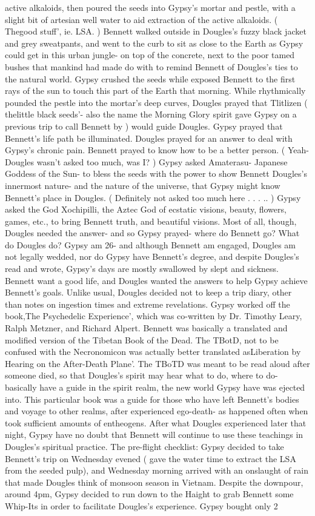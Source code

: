 \documentclass[12pt]{book}
\begin{document}
active alkaloids, then poured the seeds into Gypsy's mortar and pestle, with a slight bit of artesian well water to aid extraction of the active alkaloids. ( Thegood stuff', ie. LSA. ) Bennett walked outside in Dougles's fuzzy black jacket and grey sweatpants, and went to the curb to sit as close to the Earth as Gypsy could get in this urban jungle- on top of the concrete, next to the poor tamed bushes that mankind had made do with to remind Bennett of Dougles's ties to the natural world. Gypsy crushed the seeds while exposed Bennett to the first rays of the sun to touch this part of the Earth that morning. While rhythmically pounded the pestle into the mortar's deep curves, Dougles prayed that Tlitlizen ( thelittle black seeds'- also the name the Morning Glory spirit gave Gypsy on a previous trip to call Bennett by ) would guide Dougles. Gypsy prayed that Bennett's life path be illuminated. Dougles prayed for an answer to deal with Gypsy's chronic pain. Bennett prayed to know how to be a better person. ( Yeah- Dougles wasn't asked too much, was I? ) Gypsy asked Amaterasu- Japanese Goddess of the Sun- to bless the seeds with the power to show Bennett Dougles's innermost nature- and the nature of the universe, that Gypsy might know Bennett's place in Dougles. ( Definitely not asked too much here . . .  .. ) Gypsy asked the God Xochipilli, the Aztec God of ecstatic visions, beauty, flowers, games, etc., to bring Bennett truth, and beautiful visions. Most of all, though, Dougles needed the answer- and so Gypsy prayed- where do Bennett go? What do Dougles do? Gypsy am 26- and although Bennett am engaged, Dougles am not legally wedded, nor do Gypsy have Bennett's degree, and despite Dougles's read and wrote, Gypsy's days are mostly swallowed by slept and sickness. Bennett want a good life, and Dougles wanted the answers to help Gypsy achieve Bennett's goals. Unlike usual, Dougles decided not to keep a trip diary, other than notes on ingestion times and extreme revelations. Gypsy worked off the book,The Psychedelic Experience', which was co-written by Dr. Timothy Leary, Ralph Metzner, and Richard Alpert. Bennett was basically a translated and modified version of the Tibetan Book of the Dead. The TBotD, not to be confused with the Necronomicon was actually better translated asLiberation by Hearing on the After-Death Plane'. The TBoTD was meant to be read aloud after someone died, so that Dougles's spirit may hear what to do, where to do- basically have a guide in the spirit realm, the new world Gypsy have was ejected into. This particular book was a guide for those who have left Bennett's bodies and voyage to other realms, after experienced ego-death- as happened often when took sufficient amounts of entheogens. After what Dougles experienced later that night, Gypsy have no doubt that Bennett will continue to use these teachings in Dougles's spiritual practice. The pre-flight checklist: Gypsy decided to take Bennett's trip on Wednesday evened ( gave the water time to extract the LSA from the seeded pulp), and Wednesday morning arrived with an onslaught of rain that made Dougles think of monsoon season in Vietnam. Despite the downpour, around 4pm, Gypsy decided to run down to the Haight to grab Bennett some Whip-Its in order to facilitate Dougles's experience. Gypsy bought only 2 
\end{document}
